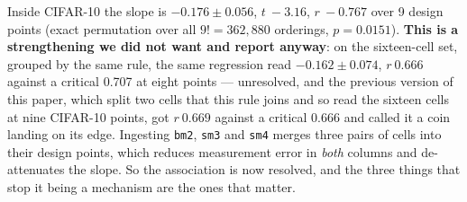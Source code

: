\documentclass[10pt,letterpaper]{article}
\newcommand{\arm}[1]{\texttt{#1}}
\begin{document}
Inside CIFAR-10 the slope is $\mathbf{-0.176 \pm 0.056}$, $t\ -3.16$, $r\ -0.767$ over 9 design
points (exact permutation over all $9! = 362{,}880$ orderings, $p = 0.0151$). \textbf{This is
a strengthening we did not want and report anyway}: on the sixteen-cell set, grouped by the same
rule, the same regression read $-0.162 \pm 0.074$, $r\ 0.666$ against a critical 0.707 at eight
points --- unresolved, and the previous version of this paper, which split two cells that this
rule joins and so read the sixteen cells at nine CIFAR-10 points, got $r\ 0.669$ against a
critical 0.666 and called it a coin landing on its edge. Ingesting \arm{bm2}, \arm{sm3} and \arm{sm4} merges three pairs of cells
into their design points, which reduces measurement error in \emph{both} columns and de-attenuates
the slope. So the association is now resolved, and the three things that stop it being a mechanism
are the ones that matter.
\end{document}
